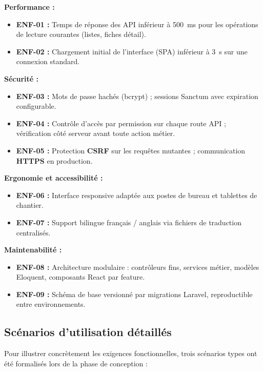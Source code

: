 \textbf{Performance :}
\begin{itemize}
  \item \textbf{ENF-01 :} Temps de réponse des API inférieur à 500~ms pour les
  opérations de lecture courantes (listes, fiches détail).
  \item \textbf{ENF-02 :} Chargement initial de l'interface (SPA) inférieur à 3~s
  sur une connexion standard.
\end{itemize}

\textbf{Sécurité :}
\begin{itemize}
  \item \textbf{ENF-03 :} Mots de passe hachés (bcrypt) ; sessions Sanctum avec
  expiration configurable.
  \item \textbf{ENF-04 :} Contrôle d'accès par permission sur chaque route API ;
  vérification côté serveur avant toute action métier.
  \item \textbf{ENF-05 :} Protection \textbf{CSRF} sur les requêtes mutantes ;
  communication \textbf{HTTPS} en production.
\end{itemize}

\textbf{Ergonomie et accessibilité :}
\begin{itemize}
  \item \textbf{ENF-06 :} Interface responsive adaptée aux postes de bureau et
  tablettes de chantier.
  \item \textbf{ENF-07 :} Support bilingue français / anglais via fichiers de
  traduction centralisés.
\end{itemize}

\textbf{Maintenabilité :}
\begin{itemize}
  \item \textbf{ENF-08 :} Architecture modulaire : contrôleurs fins, services métier,
  modèles Eloquent, composants React par feature.
  \item \textbf{ENF-09 :} Schéma de base versionné par migrations Laravel,
  reproductible entre environnements.
\end{itemize}

\subsection{Scénarios d'utilisation détaillés}

Pour illustrer concrètement les exigences fonctionnelles, trois scénarios types ont
été formalisés lors de la phase de conception :

\medskip

